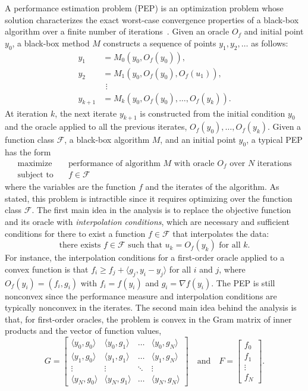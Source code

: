 \documentclass{juliacon}
\def\F{\mathcal{F}}
\DeclareMathOperator*{\maximize}{maximize}
\def\df{\nabla\!f}
\newcommand{\bmat}[1]{\begin{bmatrix}#1\end{bmatrix}}
\begin{document}
A performance estimation problem (PEP) is an optimization problem whose solution characterizes the exact worst-case convergence properties of a black-box algorithm over a finite number of iterations~\cite{pep-original,pep}. Given an oracle $O_f$ and initial point $y_0$, a black-box method $M$ constructs a sequence of points $y_1,y_2,\ldots$ as follows:
\begin{align*}
  y_1 &= M_0(y_0,O_f(y_0)), \\
  y_2 &= M_1(y_0,O_f(y_0),O_f(u_1)), \\
    &\ \, \vdots \\
  y_{k+1} &= M_k(y_0,O_f(y_0),\ldots,O_f(y_k)).
\end{align*}
At iteration $k$, the next iterate $y_{k+1}$ is constructed from the initial condition $y_0$ and the oracle applied to all the previous iterates, $O_f(y_0),\ldots,O_f(y_k)$. Given a function class $\F$, a black-box algorithm $M$, and an initial point $y_0$, a typical PEP has the form
\begin{align*}
  \maximize \quad & \text{performance of algorithm $M$ with oracle $O_f$ over $N$ iterations} \\
  \text{subject to} \quad & f\in\F
\end{align*}
where the variables are the function $f$ and the iterates of the algorithm. As stated, this problem is intractible since it requires optimizing over the function class $\F$. The first main idea in the analysis is to replace the objective function and its oracle with \textit{interpolation conditions}, which are necessary and sufficient conditions for there to exist a function $f\in\F$ that interpolates the data:
\[
  \text{there exists }f\in\F \text{ such that }u_k = O_f(y_k) \text{ for all }k.
\]
For instance, the interpolation conditions for a first-order oracle applied to a convex function is that $f_i \geq f_j + \langle g_j, y_i-y_j\rangle$ for all $i$ and $j$, where $O_f(y_i) = (f_i,g_i)$ with $f_i = f(y_i)$ and $g_i = \df(y_i)$. The PEP is still nonconvex since the performance measure and interpolation conditions are typically nonconvex in the iterates. The second main idea behind the analysis is that, for first-order oracles, the problem is convex in the Gram matrix of inner products and the vector of function values,
\[
  G = \bmat{\langle y_0, g_0\rangle & \langle y_0, g_1\rangle & \ldots & \langle y_0,g_N\rangle \\ \langle y_1, g_0\rangle & \langle y_1, g_1\rangle & \ldots & \langle y_1,g_N\rangle \\ \vdots & \vdots & \ddots & \vdots \\ \langle y_N,g_0\rangle & \langle y_N,g_1\rangle & \ldots & \langle y_N,g_N\rangle}
  \quad\text{and}\quad
  F = \bmat{f_0 \\ f_1 \\ \vdots \\ f_N}.
\]
\end{document}
